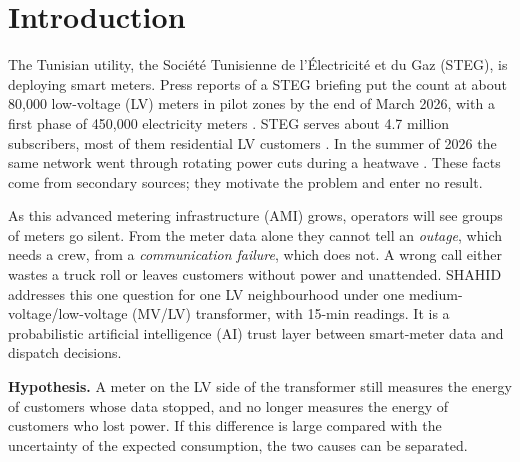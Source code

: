\section{Introduction}\label{sec:intro}
The Tunisian utility, the Société Tunisienne de l'Électricité et du Gaz (STEG), is deploying smart
meters. Press reports of a STEG briefing put the count at about 80,000 low-voltage (LV) meters in
pilot zones by the end of March 2026, with a first phase of 450,000 electricity meters
\cite{africanmanager2026compteurs,webdo2026compteurs}. STEG serves about 4.7 million subscribers,
most of them residential LV customers \cite{lapresse2025steg}. In the summer of 2026 the same network
went through rotating power cuts during a heatwave
\cite{newarab2026heatwave,africanmanager2026heat,webdo2026delestages}. These facts come from
secondary sources; they motivate the problem and enter no result.

As this advanced metering infrastructure (AMI) grows, operators will see groups of meters go silent.
From the meter data alone they cannot tell an \emph{outage}, which needs a crew, from a
\emph{communication failure}, which does not. A wrong call either wastes a truck roll or leaves
customers without power and unattended. SHAHID addresses this one question for one LV neighbourhood
under one medium-voltage/low-voltage (MV/LV) transformer, with 15-min readings. It is a probabilistic
artificial intelligence (AI) trust layer between smart-meter data and dispatch decisions.

\textbf{Hypothesis.} A meter on the LV side of the transformer still measures the energy of customers
whose data stopped, and no longer measures the energy of customers who lost power. If this difference
is large compared with the uncertainty of the expected consumption, the two causes can be separated.

